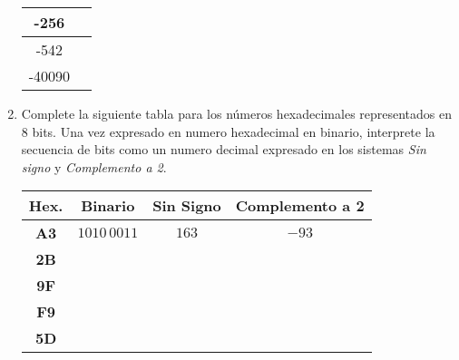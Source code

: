 \documentclass[12pt]{article}
\begin{document}
\begin{enumerate}
\begin{center}
\begin{tabular}[t]{|c|c|}
            \hline

                -256&\\

            \hline

                -542&\\

            \hline

                -40090&\\

            \hline

            \end{tabular}

        \end{center}

    \item Complete la siguiente tabla para los números hexadecimales
        representados en 8 bits. Una vez expresado en numero hexadecimal en
        binario, interprete la secuencia de bits como un numero decimal
        expresado en los sistemas \emph{Sin signo} y \emph{Complemento a 2}.

        \begin{center}

            \begin{tabular}[t]{|c|c|c|c|}

            \hline

                \textbf{Hex.} & \textbf{Binario} & \textbf{Sin Signo} & \textbf{Complemento a 2}\\

            \hline

                \textbf{A3} & $1010\,0011$ & $163$ & $-93$\\

            \hline

                \textbf{2B} & \hspace{9em}~ &~&~\\

            \hline

            \textbf{9F}&&&\\

            \hline

            \textbf{F9}&&&\\

            \hline

            \textbf{5D}&&&\\

            \hline


\end{tabular}
\end{center}
\end{enumerate}
\end{document}
